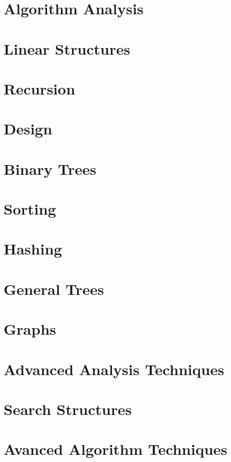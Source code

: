 \documentclass[10pt]{article}
\begin{document}
\section{Algorithm Analysis}
\newpage
\section{Linear Structures}
\newpage
\section{Recursion}
\newpage
\section{Design}
\newpage
\section{Binary Trees}
\newpage
\section{Sorting}
\newpage
\section{Hashing}
\newpage
\section{General Trees}
\newpage
\section{Graphs}
\newpage
\section{Advanced Analysis Techniques}
\newpage
\section{Search Structures}
\newpage
\section{Avanced Algorithm Techniques}
\end{document}

